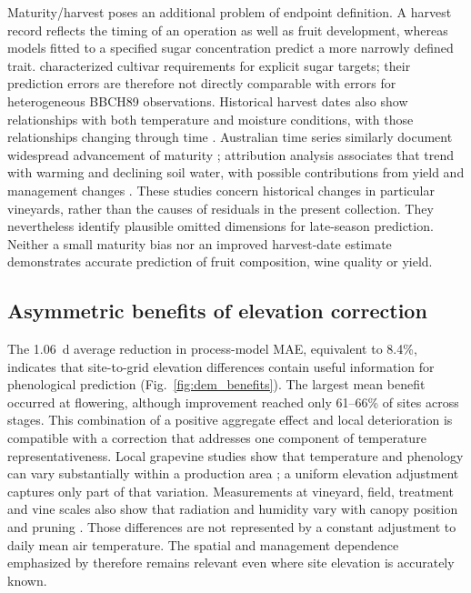 \documentclass[a4paper,12pt]{article}
\let\OriginalSubsection\subsection
\renewcommand{\subsection}{\FloatBarrier\OriginalSubsection}
\begin{document}
Maturity/harvest poses an additional problem of endpoint definition. A harvest record reflects the timing of an operation as well as fruit development, whereas models fitted to a specified sugar concentration predict a more narrowly defined trait. \citet{parkerTemperatureBasedSugarRipeness2020} characterized cultivar requirements for explicit sugar targets; their prediction errors are therefore not directly comparable with errors for heterogeneous BBCH89 observations. Historical harvest dates also show relationships with both temperature and moisture conditions, with those relationships changing through time \citep{cookClimateChangeDecouples2016}. Australian time series similarly document widespread advancement of maturity \citep{webbObservedMaturity2011}; attribution analysis associates that trend with warming and declining soil water, with possible contributions from yield and management changes \citep{webbEarlierRipening2012}. These studies concern historical changes in particular vineyards, rather than the causes of residuals in the present collection. They nevertheless identify plausible omitted dimensions for late-season prediction. Neither a small maturity bias nor an improved harvest-date estimate demonstrates accurate prediction of fruit composition, wine quality or yield.

\subsection{Asymmetric benefits of elevation correction}

The 1.06~d average reduction in process-model MAE, equivalent to 8.4\%, indicates that site-to-grid elevation differences contain useful information for phenological prediction (Fig.~\ref{fig:dem_benefits}). The largest mean benefit occurred at flowering, although improvement reached only 61--66\% of sites across stages. This combination of a positive aggregate effect and local deterioration is compatible with a correction that addresses one component of temperature representativeness. Local grapevine studies show that temperature and phenology can vary substantially within a production area \citep{deresseguierModelingGrapevinePhenology2026}; a uniform elevation adjustment captures only part of that variation. Measurements at vineyard, field, treatment and vine scales also show that radiation and humidity vary with canopy position and pruning \citep{mateseSpatialVariability2014}. Those differences are not represented by a constant adjustment to daily mean air temperature. The spatial and management dependence emphasized by \citet{neethlingSpatialComplexityTemporal2019} therefore remains relevant even where site elevation is accurately known.
\end{document}
